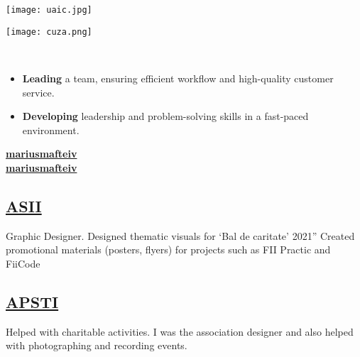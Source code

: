 \documentclass[a4paper]{MagicalCV}
\begin{document}
\lastupdated


\hfill \break





\begin{minipage}[t]{0.38\textwidth} 



\texttt{[image: uaic.jpg]} 
 \\
\vspace{\topsep} %
\sectionsep

\texttt{[image: cuza.png]} 
\\ 
\vspace{\topsep} %
\sectionsep

\\ 
\begin{itemize}
    \item \textbf{Leading} a team, ensuring efficient workflow and high-quality customer service.  
    \item \textbf{Developing} leadership and problem-solving skills in a fast-paced environment.
\end{itemize}
\sectionsep


 \href{https://github.com/mariusmafteiv}{\bf mariusmafteiv} \\
 \href{https://www.linkedin.com/in/mariusmafteiv/}{\bf mariusmafteiv}
\sectionsep

\subsection{\href{https://www.asii.ro/}{ASII}}
Graphic Designer.
Designed thematic visuals for ‘Bal de caritate’ 2021”
Created promotional materials (posters, flyers) for projects such as FII Practic and FiiCode
\sectionsep

\subsection{\href{https://www.facebook.com/AsociatiaPSTI}{APSTI}}
Helped with charitable activities. I was the association designer and also helped with photographing and recording events.
\sectionsep

\end{minipage} 
\end{document}
